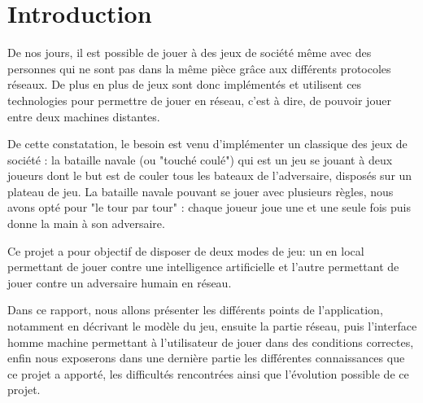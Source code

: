 \section*{Introduction} %
	De nos jours, il est possible de jouer à des jeux de société même avec des personnes qui ne sont pas dans la même pièce grâce aux différents protocoles réseaux. De plus en plus de jeux sont donc implémentés et utilisent ces technologies pour permettre de jouer en réseau, c'est à dire, de pouvoir jouer entre deux machines distantes. \newline

	De cette constatation, le besoin est venu d'implémenter un classique des jeux de société : la bataille navale (ou "touché coulé") qui est un jeu se jouant à deux joueurs dont le but est de couler tous les bateaux de l'adversaire, disposés sur un plateau de jeu. La bataille navale pouvant se jouer avec plusieurs règles, nous avons opté pour "le tour par tour" : chaque joueur joue une et une seule fois puis donne la main à son adversaire. \newline
	
	Ce projet a pour objectif de disposer de deux modes de jeu: un en local permettant de jouer contre une intelligence artificielle et l'autre permettant de jouer contre un adversaire humain en réseau.\newline
	
	Dans ce rapport, nous allons présenter les différents points de l'application, notamment en décrivant le modèle du jeu, ensuite la partie réseau, puis l'interface homme machine permettant à l'utilisateur de jouer dans des conditions correctes, enfin nous exposerons dans une dernière partie les différentes connaissances que ce projet a apporté, les difficultés rencontrées ainsi que l'évolution possible de ce projet.
